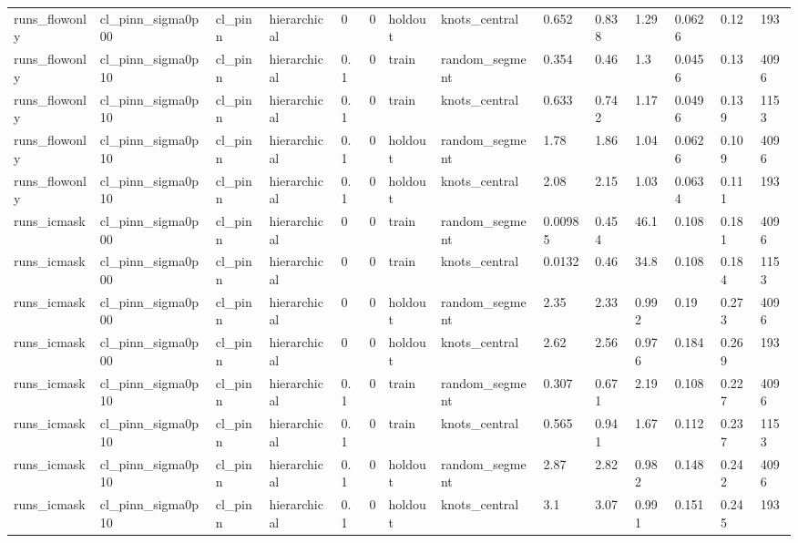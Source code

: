 \begin{table}[t]
\begin{tabular}{llllllllllllll}
runs\_flowonly & cl\_pinn\_sigma0p00 & cl\_pinn & hierarchical & 0 & 0 & holdout & knots\_central & 0.652 & 0.838 & 1.29 & 0.0626 & 0.12 & 193 \\
runs\_flowonly & cl\_pinn\_sigma0p10 & cl\_pinn & hierarchical & 0.1 & 0 & train & random\_segment & 0.354 & 0.46 & 1.3 & 0.0456 & 0.13 & 4096 \\
runs\_flowonly & cl\_pinn\_sigma0p10 & cl\_pinn & hierarchical & 0.1 & 0 & train & knots\_central & 0.633 & 0.742 & 1.17 & 0.0496 & 0.139 & 1153 \\
runs\_flowonly & cl\_pinn\_sigma0p10 & cl\_pinn & hierarchical & 0.1 & 0 & holdout & random\_segment & 1.78 & 1.86 & 1.04 & 0.0626 & 0.109 & 4096 \\
runs\_flowonly & cl\_pinn\_sigma0p10 & cl\_pinn & hierarchical & 0.1 & 0 & holdout & knots\_central & 2.08 & 2.15 & 1.03 & 0.0634 & 0.111 & 193 \\
runs\_icmask & cl\_pinn\_sigma0p00 & cl\_pinn & hierarchical & 0 & 0 & train & random\_segment & 0.00985 & 0.454 & 46.1 & 0.108 & 0.181 & 4096 \\
runs\_icmask & cl\_pinn\_sigma0p00 & cl\_pinn & hierarchical & 0 & 0 & train & knots\_central & 0.0132 & 0.46 & 34.8 & 0.108 & 0.184 & 1153 \\
runs\_icmask & cl\_pinn\_sigma0p00 & cl\_pinn & hierarchical & 0 & 0 & holdout & random\_segment & 2.35 & 2.33 & 0.992 & 0.19 & 0.273 & 4096 \\
runs\_icmask & cl\_pinn\_sigma0p00 & cl\_pinn & hierarchical & 0 & 0 & holdout & knots\_central & 2.62 & 2.56 & 0.976 & 0.184 & 0.269 & 193 \\
runs\_icmask & cl\_pinn\_sigma0p10 & cl\_pinn & hierarchical & 0.1 & 0 & train & random\_segment & 0.307 & 0.671 & 2.19 & 0.108 & 0.227 & 4096 \\
runs\_icmask & cl\_pinn\_sigma0p10 & cl\_pinn & hierarchical & 0.1 & 0 & train & knots\_central & 0.565 & 0.941 & 1.67 & 0.112 & 0.237 & 1153 \\
runs\_icmask & cl\_pinn\_sigma0p10 & cl\_pinn & hierarchical & 0.1 & 0 & holdout & random\_segment & 2.87 & 2.82 & 0.982 & 0.148 & 0.242 & 4096 \\
runs\_icmask & cl\_pinn\_sigma0p10 & cl\_pinn & hierarchical & 0.1 & 0 & holdout & knots\_central & 3.1 & 3.07 & 0.991 & 0.151 & 0.245 & 193 \\
\bottomrule
\end{tabular}
\end{table}
